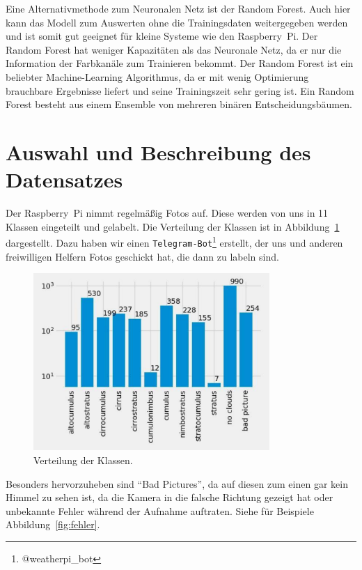 Eine Alternativmethode zum Neuronalen Netz ist der Random Forest. Auch
hier kann das Modell zum Auswerten ohne die Trainingsdaten weitergegeben
werden und ist somit gut geeignet für kleine Systeme wie den Raspberry~Pi.
Der Random Forest hat weniger Kapazitäten als das Neuronale Netz, da
er nur die Information der Farbkanäle zum Trainieren bekommt. Der Random
Forest ist ein beliebter Machine-Learning Algorithmus, da er mit wenig
Optimierung brauchbare Ergebnisse liefert und seine Trainingszeit sehr
gering ist. Ein Random Forest besteht aus einem Ensemble von mehreren
binären Entscheidungsbäumen.

\hypertarget{auswahl-und-beschreibung-des-datensatzes}{%
\section{Auswahl und Beschreibung des
Datensatzes}\label{auswahl-und-beschreibung-des-datensatzes}}

Der Raspberry~Pi nimmt regelmäßig Fotos auf. Diese werden von uns in 11
Klassen eingeteilt und gelabelt.
Die Verteilung der Klassen ist in Abbildung~\ref{fig:verteilung} dargestellt.
Dazu haben wir einen
\texttt{Telegram-Bot}\footnote{@weatherpi\_bot} erstellt, der uns und
anderen freiwilligen Helfern Fotos geschickt hat, die dann zu labeln
sind.

\begin{figure}
\centering
\includegraphics[width=0.8\textwidth]{content/histogramm_samples.pdf}
\caption{Verteilung der Klassen.}%
\label{fig:verteilung}
\end{figure}

Besonders hervorzuheben sind \enquote{Bad Pictures}, da auf diesen zum einen
gar kein Himmel zu sehen ist, da die Kamera in die falsche Richtung
gezeigt hat
oder unbekannte Fehler während der
Aufnahme auftraten.
Siehe für Beispiele Abbildung~\ref{fig:fehler}.


